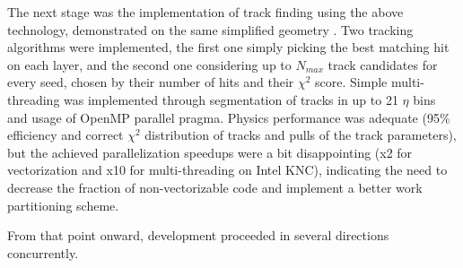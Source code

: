 \documentclass{webofc}
\begin{document}
The next stage was the implementation of track finding using the above
technology, demonstrated on the same simplified geometry \cite{pkf-finding}. Two
tracking algorithms were implemented, the first one simply picking the best
matching hit on each layer, and the second one considering up to $N_{max}$ track
candidates for every seed, chosen by their number of hits and their $\chi^2$
score. Simple multi-threading was implemented through segmentation of tracks in
up to 21 $\eta$ bins and usage of OpenMP parallel pragma. Physics performance
was adequate (95\% efficiency and correct $\chi^2$ distribution of tracks and
pulls of the track parameters), but the achieved parallelization speedups were a
bit disappointing (x2 for vectorization and x10 for multi-threading on Intel
KNC), indicating the need to decrease the fraction of non-vectorizable code and
implement a better work partitioning scheme.

From that point onward, development proceeded in several directions concurrently.
\end{document}
